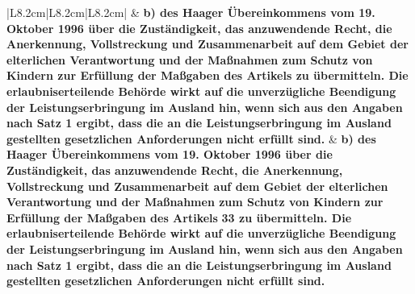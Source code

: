 \documentclass[10pt,a4paper,landscape]{article}
\begin{document}
\begin{longtable}{|L{8.2cm}|L{8.2cm}|L{8.2cm}|}
 & \textbf{b)   \newline des Haager Übereinkommens vom 19.  \newline Oktober 1996 über die Zuständigkeit,  \newline das anzuwendende Recht, die  \newline Anerkennung, Vollstreckung und  \newline Zusammenarbeit auf dem Gebiet der  \newline elterlichen Verantwortung und der  \newline Maßnahmen zum Schutz von Kindern  \newline zur Erfüllung der Maßgaben des Artikels   zu übermitteln. Die  \newline erlaubniserteilende Behörde wirkt auf  \newline die unverzügliche Beendigung der  \newline Leistungserbringung im Ausland hin,  \newline wenn sich aus den Angaben nach Satz 1  \newline ergibt, dass die an die  \newline Leistungserbringung im Ausland  \newline gestellten gesetzlichen Anforderungen  \newline nicht erfüllt sind. } & \textbf{b)   \newline des Haager Übereinkommens vom 19.  \newline Oktober 1996 über die Zuständigkeit,  \newline das anzuwendende Recht, die  \newline Anerkennung, Vollstreckung und  \newline Zusammenarbeit auf dem Gebiet der  \newline elterlichen Verantwortung und der  \newline Maßnahmen zum Schutz von Kindern  \newline zur Erfüllung der Maßgaben des Artikels } \textbf{33 zu übermitteln. Die  \newline erlaubniserteilende Behörde wirkt auf  \newline die unverzügliche Beendigung der  \newline Leistungserbringung im Ausland hin,  \newline wenn sich aus den Angaben nach Satz 1  \newline ergibt, dass die an die  \newline Leistungserbringung im Ausland  \newline gestellten gesetzlichen Anforderungen  \newline nicht erfüllt sind. } \\

\end{longtable}
\end{document}

